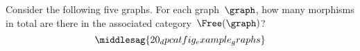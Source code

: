 \vfill
\begin{widepar}
\begin{gradedexercise}
    \label{ex:HowManyMorphisms}
    Consider the following five graphs.
    For each graph~$\graph$, how many morphisms in total are there in the associated category~$\Free(\graph)$?
    \begin{equation}
        \middlesag{20_dpcatfig_example_graphs}
    \end{equation}
\end{gradedexercise}
\end{widepar}
